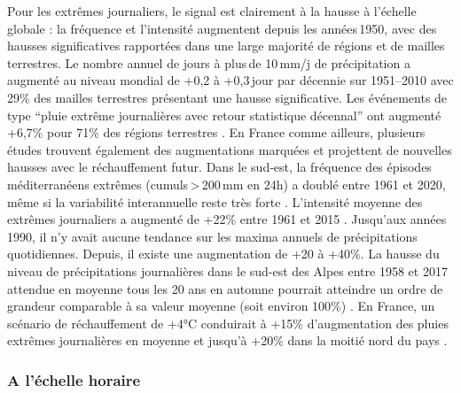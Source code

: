 \documentclass[
  article,
  nofooter,
  noheadings]{jss}
\begin{document}
Pour les extrêmes journaliers, le signal est clairement à la hausse à
l'échelle globale : la fréquence et l'intensité augmentent depuis les
années\,1950, avec des hausses significatives rapportées dans une large
majorité de régions et de mailles terrestres. Le nombre annuel de jours
à plus\,de 10\,mm/j de précipitation a augmenté au niveau mondial de
+0,2 à +0,3\,jour par décennie sur 1951--2010 \citep{Donat2013} avec
29\% des mailles terrestres présentant une hausse significative. Les
événements de type ``pluie extrême journalières avec retour statistique
décennal'' ont augmenté +6,7\% pour 71\% des régions terrestres
\citep{IPCC2021}. En France comme ailleurs, plusieurs études trouvent
également des augmentations marquées et projettent de nouvelles hausses
avec le réchauffement futur. Dans le sud‑est, la fréquence des épisodes
méditerranéens extrêmes (cumuls\,\textgreater\,200\,mm en 24h) a doublé
entre 1961 et 2020, même si la variabilité interannuelle reste très
forte \citep{meteofrance2024_episodesMediterraneens}. L'intensité
moyenne des extrêmes journaliers a augmenté de +22\% entre 1961 et 2015
\citep{Ribes2019}. Jusqu'aux années 1990, il n'y avait aucune tendance
sur les maxima annuels de précipitations quotidiennes. Depuis, il existe
une augmentation de +20 à +40\%. La hausse du niveau de précipitations
journalières dans le sud-est des Alpes entre 1958 et 2017 attendue en
moyenne tous les 20 ans en automne pourrait atteindre un ordre de
grandeur comparable à sa valeur moyenne (soit environ 100\%)
\citep{blanchet2021explaining}. En France, un scénario de réchauffement
de +4°C conduirait à +15\% d'augmentation des pluies extrêmes
journalières en moyenne et jusqu'à +20\% dans la moitié nord du pays
\citep{soubeyroux:hal-04991790}.

\subsubsection{A l'échelle horaire}\label{a-luxe9chelle-horaire}
\end{document}
